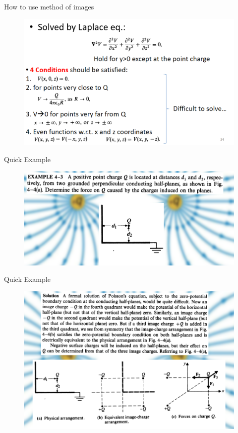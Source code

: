 \documentclass[xcolor={dvipsnames}]{beamer}
\begin{document}
\begin{frame}{How to use method of images}
\begin{figure}
	\centering
	\includegraphics[width=0.9\linewidth]{6_2.png}
\end{figure}
\end{frame}
\begin{frame}{Quick Example}
\begin{figure}
	\centering
	\includegraphics[width=0.9\linewidth]{6_3.png}
\end{figure}
\end{frame}
\begin{frame}{Quick Example}
\begin{figure}
	\centering
	\includegraphics[width=0.9\linewidth]{6_4.png}
\end{figure}
\end{frame}
\end{document}
